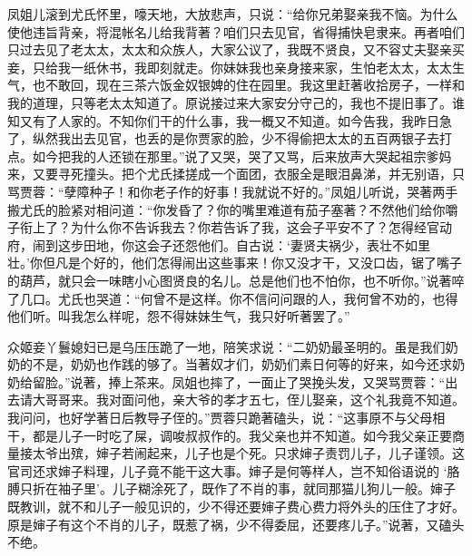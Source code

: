 \begin{parag}
    凤姐儿滚到尤氏怀里，嚎天地，大放悲声，只说：“给你兄弟娶亲我不恼。为什么使他违旨背亲，将混帐名儿给我背著？咱们只去见官，省得捕快皂隶来。再者咱们只过去见了老太太，太太和众族人，大家公议了，我既不贤良，又不容丈夫娶亲买妾，只给我一纸休书，我即刻就走。你妹妹我也亲身接来家，生怕老太太，太太生气，也不敢回，现在三茶六饭金奴银婢的住在园里。我这里赶著收拾房子，一样和我的道理，只等老太太知道了。原说接过来大家安分守己的，我也不提旧事了。谁知又有了人家的。不知你们干的什么事，我一概又不知道。如今告我，我昨日急了，纵然我出去见官，也丢的是你贾家的脸，少不得偷把太太的五百两银子去打点。如今把我的人还锁在那里。”说了又哭，哭了又骂，后来放声大哭起祖宗爹妈来，又要寻死撞头。把个尤氏揉搓成一个面团，衣服全是眼泪鼻涕，并无别语，只骂贾蓉：“孽障种子！和你老子作的好事！我就说不好的。”凤姐儿听说，哭著两手搬尤氏的脸紧对相问道：“你发昏了？你的嘴里难道有茄子塞著？不然他们给你嚼子衔上了？为什么你不告诉我去？你若告诉了我，这会子平安不了？怎得经官动府，闹到这步田地，你这会子还怨他们。自古说：‘妻贤夫祸少，表壮不如里壮。’你但凡是个好的，他们怎得闹出这些事来！你又没才干，又没口齿，锯了嘴子的葫芦，就只会一味瞎小心图贤良的名儿。总是他们也不怕你，也不听你。”说著啐了几口。尤氏也哭道：“何曾不是这样。你不信问问跟的人，我何曾不劝的，也得他们听。叫我怎么样呢，怨不得妹妹生气，我只好听著罢了。”
\end{parag}


\begin{parag}
    众姬妾丫鬟媳妇已是乌压压跪了一地，陪笑求说：“二奶奶最圣明的。虽是我们奶奶的不是，奶奶也作践的够了。当著奴才们，奶奶们素日何等的好来，如今还求奶奶给留脸。”说著，捧上茶来。凤姐也摔了，一面止了哭挽头发，又哭骂贾蓉：“出去请大哥哥来。我对面问他，亲大爷的孝才五七，侄儿娶亲，这个礼我竟不知道。我问问，也好学著日后教导子侄的。”贾蓉只跪著磕头，说：“这事原不与父母相干，都是儿子一时吃了屎，调唆叔叔作的。我父亲也并不知道。如今我父亲正要商量接太爷出殡，婶子若闹起来，儿子也是个死。只求婶子责罚儿子，儿子谨领。这官司还求婶子料理，儿子竟不能干这大事。婶子是何等样人，岂不知俗语说的 ‘胳膊只折在袖子里’。儿子糊涂死了，既作了不肖的事，就同那猫儿狗儿一般。婶子既教训，就不和儿子一般见识的，少不得还要婶子费心费力将外头的压住了才好。原是婶子有这个不肖的儿子，既惹了祸，少不得委屈，还要疼儿子。”说著，又磕头不绝。
\end{parag}


